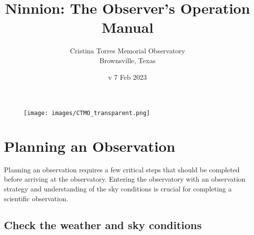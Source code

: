 \documentclass{article}
\title{Ninnion: The Observer's Operation Manual}
\author{Cristina Torres Memorial Observatory \\
	Brownsville, Texas}
\date{v 7 Feb 2023}
\begin{document}
	
	\maketitle
	
	\begin{figure}[b]
		\centering
		\texttt{[image: images/CTMO\_transparent.png]}
	\end{figure}
	
	\newpage
	\tableofcontents
	
	\newpage
	\section{Planning an Observation}
	\label{sec:planning-an-observation}
	
	Planning an observation requires a few critical steps that should be completed before arriving at the observatory. Entering the observatory with an observation strategy and understanding of the sky conditions is crucial for completing a scientific observation.
	
	\subsection{Check the weather and sky conditions}
	\label{sec:check-the-weather-and-sky-conditions}
	
\end{document}
